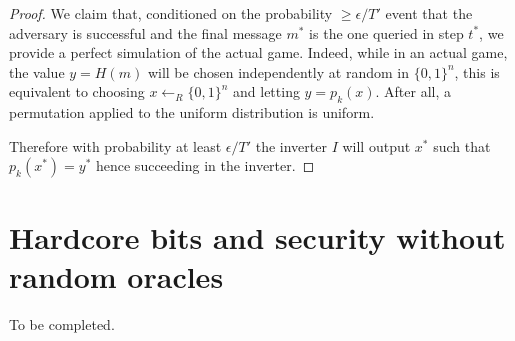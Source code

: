 \begin{proof}
We claim that, conditioned on the probability \(\geq \epsilon/T'\) event
that the adversary is successful and the final message \(m^*\) is the
one queried in step \(t^*\), we provide a perfect simulation of the
actual game. Indeed, while in an actual game, the value \(y=H(m)\) will
be chosen independently at random in \(\{0,1\}^n\), this is equivalent
to choosing \(x \leftarrow_R \{0,1\}^n\) and letting \(y=p_k(x)\). After
all, a permutation applied to the uniform distribution is uniform.

Therefore with probability at least \(\epsilon/T'\) the inverter \(I\)
will output \(x^*\) such that \(p_k(x^*)=y^*\) hence succeeding in the
inverter.

\end{proof}


\hypertarget{hashandsignrem}{}

\section{Hardcore bits and security without random
oracles}\label{Hardcore-bits-and-securit}

To be completed.
